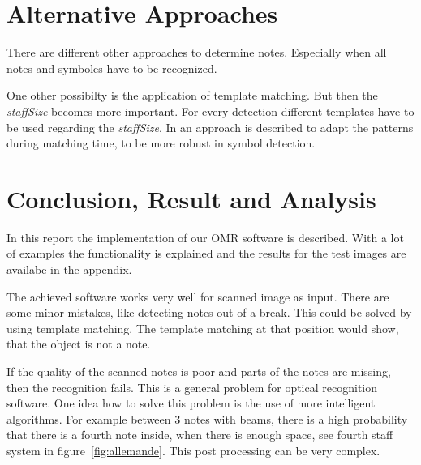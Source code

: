 \section{Alternative Approaches}

There are different other approaches to determine notes. Especially when all notes and symboles have to be recognized.

One other possibilty is the application of template matching. But then the \textit{staffSize} becomes more important. For every detection different templates have to be used regarding the \textit{staffSize}.
In \cite{Mcpherson_2002_IntrFeedIntoAn} an approach is described to adapt the patterns during matching time, to be more robust in symbol detection. 


\section{Conclusion, Result and Analysis}

In this report the implementation of our OMR software is described. With a lot of examples the functionality is explained and the results for the test images are availabe in the appendix. 

The achieved software works very well for scanned image as input. There are some minor mistakes, like detecting notes out of a break. This could be solved by using template matching. The template matching at that position would show, that the object is not a note. 

If the quality of the scanned notes is poor and parts of the notes are missing, then the recognition fails. This is a general problem for optical recognition software. One idea how to solve this problem is the use of more intelligent algorithms. For example between 3 notes with beams, there is a high probability that there is a fourth note inside, when there is enough space, see fourth staff system in figure~\ref{fig:allemande}. This post processing can be very complex.

